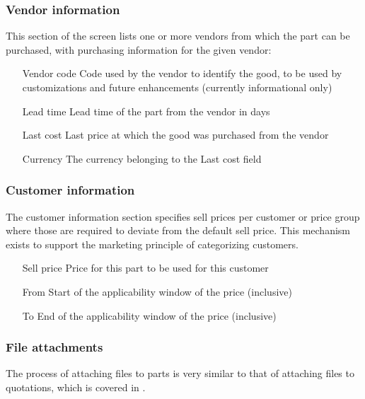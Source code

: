 \subsubsection{Vendor information}
\label{subsubsec-parts-vendor-information}

This section of the screen lists one or more vendors from which the part can be
purchased, with purchasing information for the given vendor:

\begin{itemize}
\item [Vendor code] Code used by the vendor to identify the good, to be used by
    customizations and future enhancements (currently informational only)
\item [Lead time] Lead time of the part from the vendor in days
\item [Last cost] Last price at which the good was purchased from the vendor
\item [Currency] The currency belonging to the Last cost field
\end{itemize}

\subsubsection{Customer information}
\label{subsubsec-parts-customer-information}

The customer information section specifies sell prices per customer or price group
where those are required to deviate from the default sell price. This mechanism exists
to support the marketing principle of categorizing customers.

\begin{itemize}
\item [Sell price] Price for this part to be used for this customer
\item [From] Start of the applicability window of the price (inclusive)
\item [To] End of the applicability window of the price (inclusive)
\end{itemize}

\subsubsection{File attachments}
\label{subsubsec-parts-file-attachments}

The process of attaching files to parts is very similar to that of
attaching files to quotations, which is covered in .

